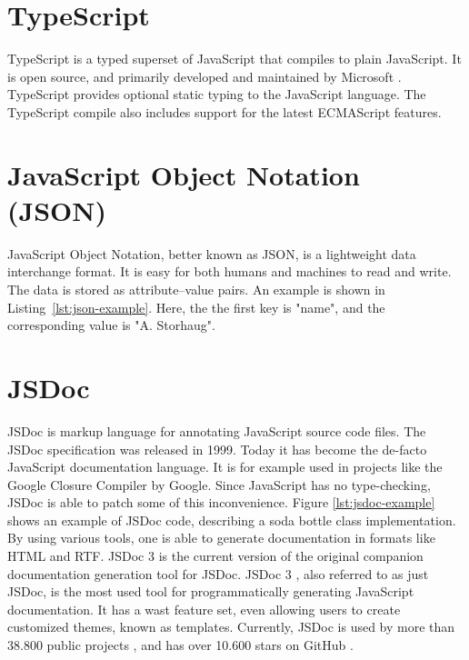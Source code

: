 \section{TypeScript}
TypeScript \cite{typescript} is a typed superset of JavaScript that compiles to plain JavaScript. It is open source, and primarily developed and maintained by Microsoft \cite{microsoft}. TypeScript provides optional static typing to the JavaScript language. The TypeScript compile also includes support for the latest ECMAScript features.

\section{JavaScript Object Notation (JSON)}
JavaScript Object Notation, better known as JSON, is a lightweight data interchange format. It is easy for both humans and machines to read and write. The data is stored as attribute–value pairs. An example is shown in Listing~\ref{lst:json-example}. Here, the the first key is "name", and the corresponding value is "A. Storhaug".


\section{JSDoc}
JSDoc is markup language for annotating JavaScript source code files. The JSDoc specification was released in 1999. Today it has become the de-facto JavaScript documentation language. It is for example used in projects like the Google Closure Compiler \cite{google-closure-compiler} by Google. Since JavaScript has no type-checking, JSDoc is able to patch some of this inconvenience. Figure \ref{lst:jsdoc-example} shows an example of JSDoc code, describing a soda bottle class implementation. By using various tools, one is able to generate documentation in formats like HTML and RTF. JSDoc 3 is the current version of the original companion documentation generation tool for JSDoc. JSDoc 3 \cite{jsdoc-3}, also referred to as just JSDoc, is the most used tool for programmatically generating JavaScript documentation. It has a wast feature set, even allowing users to create customized themes, known as templates. Currently, JSDoc is used by more than 38.800 public projects \cite{jsdoc-used-by}, and has over 10.600 stars on GitHub \cite{jsdoc-stargazers}.




